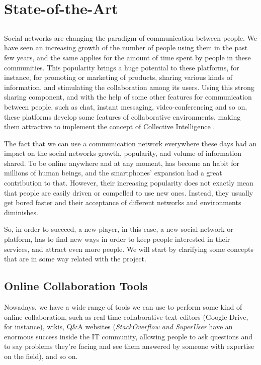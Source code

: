 \chapter{State-of-the-Art} \label{chap:chap2}

\section*{}

Social networks are changing the paradigm of communication between people. We have seen an increasing growth of the number of people using them in the past few years, and the same applies for the amount of time spent by people in these communities. This popularity brings a huge potential to these platforms, for instance, for promoting or marketing of products, sharing various kinds of information, and stimulating the collaboration among its users.
Using this strong sharing component, and with the help of some other features for communication between people, such as chat, instant messaging, video-conferencing and so on, these platforms develop some features of collaborative environments, making them attractive to implement the concept of Collective Intelligence \cite{kn:Fle08}. 

The fact that we can use a communication network everywhere these days had an impact on the social networks growth, popularity, and volume of information shared. To be online anywhere and at any moment, has become an habit for millions of human beings, and the smartphones' expansion had a great contribution to that. 
However, their increasing popularity does not exactly mean that people are easily driven or compelled to use new ones. Instead, they usually get bored faster and their acceptance of different networks and environments diminishes. 

So, in order to succeed, a new player, in this case, a new social network or platform, has to find new ways in order to keep people interested in their services, and attract even more people.  We will start by clarifying some concepts that are in some way related with the project.

\section{Online Collaboration Tools}\label{sec:onlinecol}

Nowadays, we have a wide range of tools we can use to perform some kind of online collaboration, such as real-time collaborative text editors (Google Drive, for instance), wikis, Q\&A websites (\emph{StackOverflow and SuperUser} have an enormous success inside the IT community, allowing people to ask questions and to say problems they're facing and see them answered by someone with expertise on the field), and so on.

